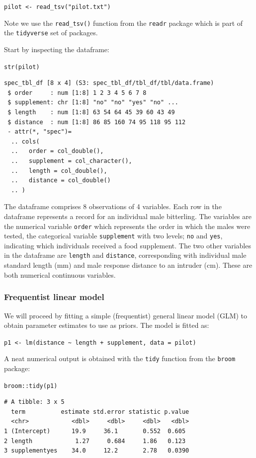 \documentclass[
]{book}
\begin{document}
\texttt{pilot\ \textless{}-\ read\_tsv("pilot.txt")}

Note we use the \texttt{read\_tsv()} function from the \texttt{readr} package which is part of the \texttt{tidyverse} set of packages.

Start by inspecting the dataframe:

\texttt{str(pilot)}

\begin{verbatim}
spec_tbl_df [8 x 4] (S3: spec_tbl_df/tbl_df/tbl/data.frame)
 $ order     : num [1:8] 1 2 3 4 5 6 7 8
 $ supplement: chr [1:8] "no" "no" "yes" "no" ...
 $ length    : num [1:8] 63 54 64 45 39 60 43 49
 $ distance  : num [1:8] 86 85 160 74 95 118 95 112
 - attr(*, "spec")=
  .. cols(
  ..   order = col_double(),
  ..   supplement = col_character(),
  ..   length = col_double(),
  ..   distance = col_double()
  .. )
\end{verbatim}

The dataframe comprises 8 observations of 4 variables. Each row in the dataframe represents a record for an individual male bitterling. The variables are the numerical variable \texttt{order} which represents the order in which the males were tested, the categorical variable \texttt{supplement} with two levels; \texttt{no} and \texttt{yes}, indicating which individuals received a food supplement. The two other variables in the dataframe are \texttt{length} and \texttt{distance}, corresponding with individual male standard length (mm) and male response distance to an intruder (cm). These are both numerical continuous variables.

\hypertarget{frequentist-linear-model}{%
\subsubsection{Frequentist linear model}\label{frequentist-linear-model}}

We will proceed by fitting a simple (frequentist) general linear model (GLM) to obtain parameter estimates to use as priors. The model is fitted as:

\texttt{p1\ \textless{}-\ lm(distance\ \textasciitilde{}\ length\ +\ supplement,\ data\ =\ pilot)}

A neat numerical output is obtained with the \texttt{tidy} function from the \texttt{broom} package:

\texttt{broom::tidy(p1)}

\begin{verbatim}
# A tibble: 3 x 5
  term          estimate std.error statistic p.value
  <chr>            <dbl>     <dbl>     <dbl>   <dbl>
1 (Intercept)      19.9     36.1       0.552  0.605 
2 length            1.27     0.684     1.86   0.123 
3 supplementyes    34.0     12.2       2.78   0.0390
\end{verbatim}
\end{document}
